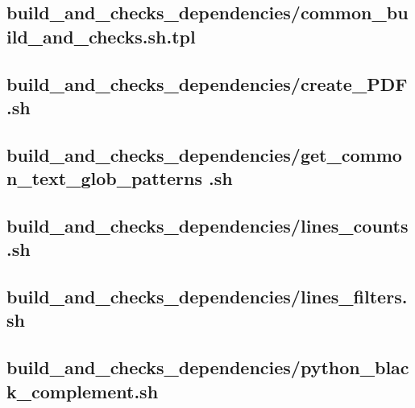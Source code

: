 \documentclass{article}
\begin{document}


\subsection{
  build\_and\_checks\_dependencies/common\_build\_and\_checks.sh.tpl
}
\label{
  build_and_checks_dependencies:common_build_and_checksshtpl
}



\subsection{
  build\_and\_checks\_dependencies/create\_PDF.sh
}
\label{
  build_and_checks_dependencies:create_PDFsh
}



\subsection{
  build\_and\_checks\_dependencies/get\_common\_text\_glob\_patterns%
.sh
}
\label{
  build_and_checks_dependencies:get_common_text_glob_patternssh
}



\subsection{
  build\_and\_checks\_dependencies/lines\_counts.sh
}
\label{
  build_and_checks_dependencies:lines_countssh
}



\subsection{
  build\_and\_checks\_dependencies/lines\_filters.sh
}
\label{
  build_and_checks_dependencies:lines_filterssh
}



\subsection{
  build\_and\_checks\_dependencies/python\_black\_complement.sh
}
\label{
  build_and_checks_dependencies:python_black_complementsh
}
\end{document}
